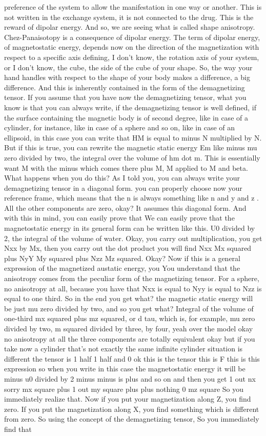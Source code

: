 preference of the system to allow the manifestation in one way or another. This is not written in the exchange system, it is not connected to the drug. This is the reward of dipolar energy. And so, we are seeing what is called shape anisotropy. Chez-Panaisotopy is a consequence of dipolar energy. The term of dipolar energy, of magnetostatic energy, depends now on the direction of the magnetization with respect to a specific axis defining, I don't know, the rotation axis of your system, or I don't know, the cube, the side of the cube of your shape. So, the way your hand handles with respect to the shape of your body makes a difference, a big difference. And this is inherently contained in the form of the demagnetizing tensor. If you assume that you have now the demagnetizing tensor, what you know is that you can always write, if the demagnetizing tensor is well defined, if the surface containing the magnetic body is of second degree, like in case of a cylinder, for instance, like in case of a sphere and so on, like in case of an ellipsoid, in this case you can write that HM is equal to minus N multiplied by N. But if this is true, you can rewrite the magnetic static energy Em like minus mu zero divided by two, the integral over the volume of hm dot m. This is essentially want M with the minus which comes there plus M, M applied to M and beta. What happens when you do this? As I told you, you can always write your demagnetizing tensor in a diagonal form. you can properly choose now your reference frame, which means that the n is always something like n and y and z . All the other components are zero, okay? It assumes this diagonal form. And with this in mind, you can easily prove that We can easily prove that the magnetostatic energy in its general form can be written like this. U0 divided by 2, the integral of the volume of water. Okay, you carry out multiplication, you get Nxx by Mx, then you carry out the dot product you will find Nxx Mx squared plus NyY My squared plus Nzz Mz squared. Okay? Now if this is a general expression of the magnetized austatic energy, you You understand that the anisotropy comes from the peculiar form of the magnetizing tensor. For a sphere, no anisotropy at all, because you have that Nxx is equal to Nyy is equal to Nzz is equal to one third. So in the end you get what? the magnetic static energy will be just mu zero divided by two, and so you get what? Integral of the volume of one-third mx squared plus mz squared, or d tau, which is, for example, mu zero divided by two, m squared divided by three, by four, yeah over the model okay no anisotropy at all the three components are totally equivalent okay but if you take now a cylinder that's not exactly the same infinite cylinder situation is different the tensor is 1 half 1 half and 0 ok this is the tensor this is F this is this expression so when you write in this case the magnetostatic energy it will be minus u0 divided by 2 minus minus is plus and so on and then you get 1 out nx sorry mx square plus 1 out my square plus plus nothing 0 mz square So you immediately realize that. Now if you put your magnetization along Z, you find zero. If you put the magnetization along X, you find something which is different from zero. So using the concept of the demagnetizing tensor, So you immediately find that 
